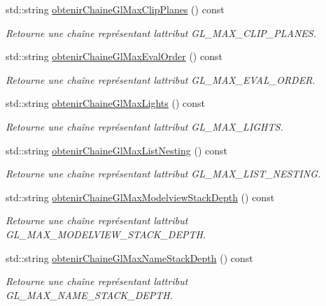 \begin{DoxyCompactItemize}
std\+::string \hyperlink{group__utilitaire_gae90d5285df064d711bedd09091ba413b}{obtenir\+Chaine\+Gl\+Max\+Clip\+Planes} () const 
\begin{DoxyCompactList}\small\item\em Retourne une chaîne représentant l\textquotesingle{}attribut G\+L\+\_\+\+M\+A\+X\+\_\+\+C\+L\+I\+P\+\_\+\+P\+L\+A\+N\+E\+S. \end{DoxyCompactList}\item 
std\+::string \hyperlink{group__utilitaire_gaf82e6892182ffe565a05329073a06248}{obtenir\+Chaine\+Gl\+Max\+Eval\+Order} () const 
\begin{DoxyCompactList}\small\item\em Retourne une chaîne représentant l\textquotesingle{}attribut G\+L\+\_\+\+M\+A\+X\+\_\+\+E\+V\+A\+L\+\_\+\+O\+R\+D\+E\+R. \end{DoxyCompactList}\item 
std\+::string \hyperlink{group__utilitaire_ga95b23ba66220abe4def913fd80f31f9c}{obtenir\+Chaine\+Gl\+Max\+Lights} () const 
\begin{DoxyCompactList}\small\item\em Retourne une chaîne représentant l\textquotesingle{}attribut G\+L\+\_\+\+M\+A\+X\+\_\+\+L\+I\+G\+H\+T\+S. \end{DoxyCompactList}\item 
std\+::string \hyperlink{group__utilitaire_gaab626bdfc4cf8d6445955270799c969a}{obtenir\+Chaine\+Gl\+Max\+List\+Nesting} () const 
\begin{DoxyCompactList}\small\item\em Retourne une chaîne représentant l\textquotesingle{}attribut G\+L\+\_\+\+M\+A\+X\+\_\+\+L\+I\+S\+T\+\_\+\+N\+E\+S\+T\+I\+N\+G. \end{DoxyCompactList}\item 
std\+::string \hyperlink{group__utilitaire_ga7a7a64fd525a66dfc542f8d38470e6df}{obtenir\+Chaine\+Gl\+Max\+Modelview\+Stack\+Depth} () const 
\begin{DoxyCompactList}\small\item\em Retourne une chaîne représentant l\textquotesingle{}attribut G\+L\+\_\+\+M\+A\+X\+\_\+\+M\+O\+D\+E\+L\+V\+I\+E\+W\+\_\+\+S\+T\+A\+C\+K\+\_\+\+D\+E\+P\+T\+H. \end{DoxyCompactList}\item 
std\+::string \hyperlink{group__utilitaire_gad22c079b7e29e5cfb6ee2fe9bb220816}{obtenir\+Chaine\+Gl\+Max\+Name\+Stack\+Depth} () const 
\begin{DoxyCompactList}\small\item\em Retourne une chaîne représentant l\textquotesingle{}attribut G\+L\+\_\+\+M\+A\+X\+\_\+\+N\+A\+M\+E\+\_\+\+S\+T\+A\+C\+K\+\_\+\+D\+E\+P\+T\+H. \end{DoxyCompactList}\item 

\end{DoxyCompactItemize}
